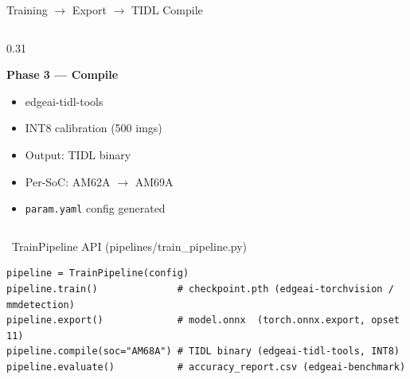 \documentclass[aspectratio=169,12pt]{beamer}
\begin{document}
\begin{frame}{Training $\to$ Export $\to$ TIDL Compile}
\begin{columns}[T]
\begin{column}{0.31\textwidth}
      \begin{block}{\textcolor{TIRed}{\textbf{Phase 3 — Compile}}}
        \begin{itemize}\scriptsize
          \item edgeai-tidl-tools
          \item INT8 calibration (500 imgs)
          \item Output: TIDL binary
          \item Per-SoC: AM62A $\to$ AM69A
          \item \texttt{param.yaml} config generated
        \end{itemize}
      \end{block}
    \end{column}
  \end{columns}
  \vspace{0.3cm}
  \begin{block}{\faPython~TrainPipeline API (pipelines/train\_pipeline.py)}
    \begin{lstlisting}
pipeline = TrainPipeline(config)
pipeline.train()              # checkpoint.pth (edgeai-torchvision / mmdetection)
pipeline.export()             # model.onnx  (torch.onnx.export, opset 11)
pipeline.compile(soc="AM68A") # TIDL binary (edgeai-tidl-tools, INT8)
pipeline.evaluate()           # accuracy_report.csv (edgeai-benchmark)
    \end{lstlisting}
  \end{block}
\end{frame}
\end{document}
